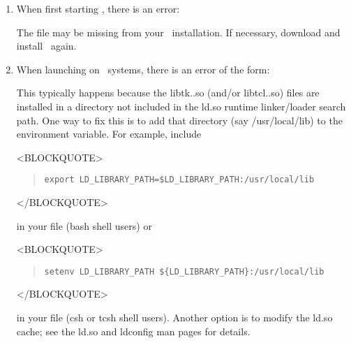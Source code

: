 \begin{enumerate}
\item When first starting , there is an error:
\begin{quote}
\raggedright
{}
\end{quote}

The file  may be missing from your 
\OOMMF\ installation.  If necessary, download and install \OOMMF\ again.

\item When launching  on \Unix\ systems, there is an error
of the form: 
\begin{quote}
\raggedright
{}
\end{quote}

This typically happens because the libtk\lb.\lb.so (and/or
libtcl\lb.\lb.so) files are installed in a directory not included in the
ld.so runtime linker/loader search path. One way to fix this is to add
that directory (say /usr/local/lib) to the 
environment variable. For example, include
\begin{rawhtml}<BLOCKQUOTE>\end{rawhtml}
\begin{quote}
\begin{verbatim}
export LD_LIBRARY_PATH=$LD_LIBRARY_PATH:/usr/local/lib 
\end{verbatim}
\end{quote}
\begin{rawhtml}</BLOCKQUOTE>\end{rawhtml}
in your  file (bash shell users) or
\begin{rawhtml}<BLOCKQUOTE>\end{rawhtml}
\begin{quote}
\begin{verbatim}
setenv LD_LIBRARY_PATH ${LD_LIBRARY_PATH}:/usr/local/lib 
\end{verbatim}
\end{quote}
\begin{rawhtml}</BLOCKQUOTE>\end{rawhtml}
in your  file (csh or tcsh shell users).  Another option
is to modify the ld.so cache; see the ld.so and ldconfig man pages for
details.


\end{enumerate}
